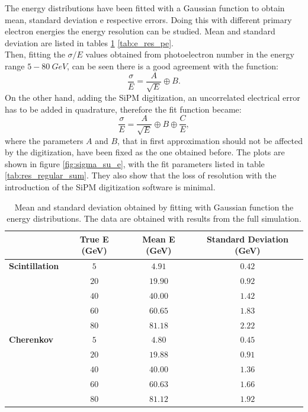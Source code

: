 The energy distributions have been fitted with a Gaussian function to obtain mean, standard deviation e respective errors. Doing this with different primary electron energies the energy resolution can be studied. Mean and standard deviation are listed in tables \ref{tab:e_res_int} \ref{tab:e_res_pe}.\\
Then, fitting the $\sigma/E$ values obtained from photoelectron number in the energy range $5-80\ GeV$, can be seen there is a good agreement with the function:
\begin{equation}\label{eq:resolution}
	\frac{\sigma}{E} = \frac{A}{\sqrt{E}} \oplus B.
\end{equation} 
On the other hand, adding the SiPM digitization, an uncorrelated electrical error has to be added in quadrature, therefore the fit function became:
\begin{equation}\label{eq:resolution}
	\frac{\sigma}{E} = \frac{A}{\sqrt{E}} \oplus B \oplus \frac{C}{E},
\end{equation} 
where the parameters $A$ and $B$, that in first approximation should not be affected by the digitization, have been fixed as the one obtained before. The plots are shown in figure \ref{fig:sigma_su_e}, with the fit parameters listed in table \ref{tab:res_regular_sum}. They also show that the loss of resolution with the introduction of the SiPM digitization software is minimal.\\

\begin{table}
	\centering
	\begin{tabular}{lccc}
		\toprule
		& True E (GeV) & Mean E (GeV) & Standard Deviation (GeV) \\
		\midrule
		\textbf{Scintillation} &	$5$ 	& $4.91$ & $0.42$ \\
		& $20$ 	& $19.90$ & $0.92$ \\
		& $40$ 	& $40.00$ & $1.42$ \\
		& $60$ 	& $60.65$ & $1.83$ \\
		& $80$ 	& $81.18$ & $2.22$ \\
		\midrule
		\textbf{Cherenkov} & $5$ 	& $4.80$ & $0.45$ \\
		& $20$ 	& $19.88$ & $0.91$ \\
		& $40$ 	& $40.00$ & $1.36$ \\
		& $60$ 	& $60.63$ & $1.66$ \\
		& $80$ 	& $81.12$ & $1.92$ \\
		\bottomrule		
	\end{tabular}
	\caption{Mean and standard deviation obtained by fitting with Gaussian function the energy distributions. The data are obtained with results from the full simulation.}
	\label{tab:e_res_int}
\end{table}

